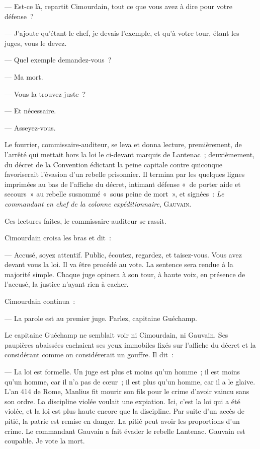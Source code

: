 \documentclass[french,twoside]{book} %
\begin{document}
— Est-ce là, repartit Cimourdain, tout ce que vous avez à dire pour votre défense ?\par
— J’ajoute qu’étant le chef, je devais l’exemple, et qu’à votre tour, étant les juges, vous le devez.\par
— Quel exemple demandez-vous ?\par
— Ma mort.\par
— Vous la trouvez juste ?\par
— Et nécessaire.\par
 — Asseyez-vous.\par
Le fourrier, commissaire-auditeur, se leva et donna lecture, premièrement, de l’arrêté qui mettait hors la loi le ci-devant marquis de Lantenac ; deuxièmement, du décret de la Convention édictant la peine capitale contre quiconque favoriserait l’évasion d’un rebelle prisonnier. Il termina par les quelques lignes imprimées au bas de l’affiche du décret, intimant défense « de porter aide et secours » au rebelle susnommé « sous peine de mort », et signées : \emph{Le commandant en chef de la colonne expéditionnaire}, G{\scshape auvain}.\par
Ces lectures faites, le commissaire-auditeur se rassit.\par
Cimourdain croisa les bras et dit :\par
— Accusé, soyez attentif. Public, écoutez, regardez, et taisez-vous. Vous avez devant vous la loi. Il va être procédé au vote. La sentence sera rendue à la majorité simple. Chaque juge opinera à son tour, à haute voix, en présence de l’accusé, la justice n’ayant rien à cacher.\par
Cimourdain continua :\par
— La parole est au premier juge. Parlez, capitaine Guéchamp.\par
Le capitaine Guéchamp ne semblait voir ni Cimourdain, ni Gauvain. Ses paupières abaissées cachaient ses yeux immobiles fixés sur l’affiche du décret et la considérant comme on considérerait un gouffre. Il dit :\par
— La loi est formelle. Un juge est plus et moins qu’un homme ; il est moins qu’un homme, car il n’a  pas de cœur ; il est plus qu’un homme, car il a le glaive. L’an 414 de Rome, Manlius fit mourir son fils pour le crime d’avoir vaincu sans son ordre. La discipline violée voulait une expiation. Ici, c’est la loi qui a été violée, et la loi est plus haute encore que la discipline. Par suite d’un accès de pitié, la patrie est remise en danger. La pitié peut avoir les proportions d’un crime. Le commandant Gauvain a fait évader le rebelle Lantenac. Gauvain est coupable. Je vote la mort.\par
\end{document}
